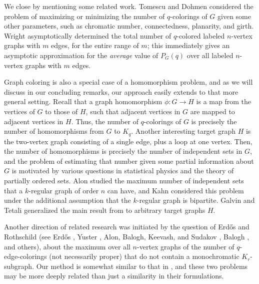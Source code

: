 \documentclass[11pt]{article}
\begin{document}
We close by mentioning some related work.  Tomescu \cite{Tomescu-max,
  Tomescu-q3-conn, Tomescu-min, Tomescu-1975, Tomescu-hamiltonian,
  Tomescu-conn-planar, Tomescu-2conn, Tomescu-blocks} and Dohmen
\cite{Dohmen-1, Dohmen-2} considered the problem of maximizing or
minimizing the number of $q$-colorings of $G$ given some other
parameters, such as chromatic number, connectedness, planarity, and
girth.  Wright \cite{Wright} asymptotically determined the total
number of $q$-colored labeled $n$-vertex graphs with $m$ edges, for
the entire range of $m$; this immediately gives an asymptotic
approximation for the \emph{average}\/ value of $P_G(q)$ over all
labeled $n$-vertex graphs with $m$ edges.

Graph coloring is also a special case of a homomorphism problem, and
as we will discuss in our concluding remarks, our approach easily
extends to that more general setting.  Recall that a graph
homomorphism $\phi : G \rightarrow H$ is a map from the vertices of
$G$ to those of $H$, such that adjacent vertices in $G$ are mapped to
adjacent vertices in $H$.  Thus, the number of $q$-colorings of $G$ is
precisely the number of homomorphisms from $G$ to $K_q$.  Another
interesting target graph $H$ is the two-vertex graph consisting of a
single edge, plus a loop at one vertex.  Then, the number of
homomorphisms is precisely the number of independent sets in $G$, and
the problem of estimating that number given some partial information
about $G$ is motivated by various questions in statistical physics and
the theory of partially ordered sets.  Alon \cite{Alon-indep-sets}
studied the maximum number of independent sets that a $k$-regular
graph of order $n$ can have, and Kahn \cite{Kahn-hard-core,
  Kahn-dedekind} considered this problem under the additional
assumption that the $k$-regular graph is bipartite.  Galvin and Tetali
\cite{Galvin-Tetali} generalized the main result from
\cite{Kahn-hard-core} to arbitrary target graphs $H$.

Another direction of related research was initiated by the question of
Erd\H{o}s and Rothschild (see Erd\H{o}s \cite{Erdos-1974, Erdos-1992},
Yuster \cite{Yuster}, Alon, Balogh, Keevash, and Sudakov \cite{ABKS},
Balogh \cite{Balogh}, and others), about the maximum over all
$n$-vertex graphs of the number of $q$-edge-colorings (not necessarily
proper) that do not contain a monochromatic $K_r$-subgraph.  Our
method is somewhat similar to that in \cite{ABKS}, and these two
problems may be more deeply related than just a similarity in their
formulations.
\end{document}
